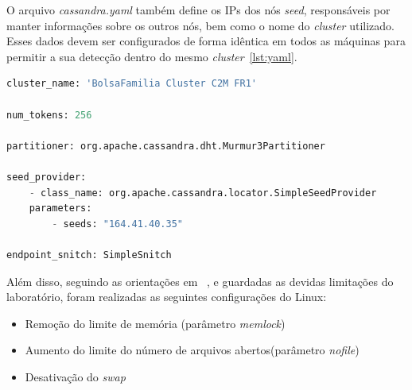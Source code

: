 O arquivo \emph{cassandra.yaml} também define os IPs dos nós \emph{seed}, responsáveis por manter informações sobre os outros nós, bem como o nome do \emph{cluster} utilizado. Esses dados devem ser configurados de forma idêntica em todos as máquinas para permitir a sua detecção dentro do mesmo \emph{cluster}~\ref{lst:yaml}.

\begin{lstlisting}[caption={Configuração cassandra.yaml},label={lst:yaml},language=python]
cluster_name: 'BolsaFamilia Cluster C2M FR1'

num_tokens: 256

partitioner: org.apache.cassandra.dht.Murmur3Partitioner

seed_provider:
	- class_name: org.apache.cassandra.locator.SimpleSeedProvider
	parameters:
		- seeds: "164.41.40.35"

endpoint_snitch: SimpleSnitch

\end{lstlisting}

Além disso, seguindo as orientações em ~\cite{cassandrasettings}, e guardadas as devidas limitações do laboratório, foram realizadas as seguintes configurações do Linux:
\begin{itemize}
	\item Remoção do limite de memória (parâmetro \emph{memlock})
	\item Aumento do limite do número de arquivos abertos(parâmetro \emph{nofile})
	\item Desativação do \emph{swap}
\end{itemize}




